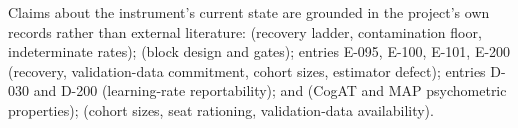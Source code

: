 Claims about the instrument's current state are grounded in the project's own
records rather than external literature:
 (recovery ladder,
contamination floor, indeterminate rates);
 (block design and gates);
 entries E-095, E-100,
E-101, E-200 (recovery, validation-data commitment, cohort sizes, estimator
defect);
 entries D-030 and D-200 (learning-rate
reportability);
 and
 (CogAT and MAP psychometric
properties);
 (cohort sizes,
seat rationing, validation-data availability).
